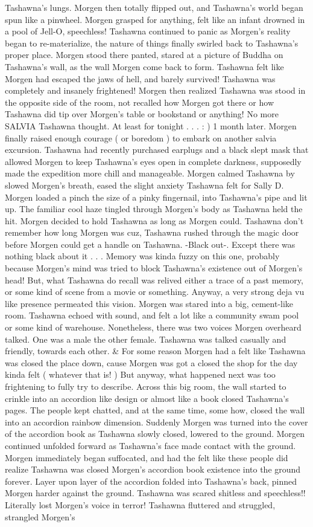 \documentclass[12pt]{book}
\begin{document}
Tashawna's lungs. Morgen then totally flipped out, and Tashawna's world began spun like a pinwheel. Morgen grasped for anything, felt like an infant drowned in a pool of Jell-O, speechless! Tashawna continued to panic as Morgen's reality began to re-materialize, the nature of things finally swirled back to Tashawna's proper place. Morgen stood there panted, stared at a picture of Buddha on Tashawna's wall, as the wall Morgen come back to form. Tashawna felt like Morgen had escaped the jaws of hell, and barely survived! Tashawna was completely and insanely frightened! Morgen then realized Tashawna was stood in the opposite side of the room, not recalled how Morgen got there or how Tashawna did tip over Morgen's table or bookstand or anything! No more SALVIA Tashawna thought. At least for tonight . . .  :  ) 1 month later. Morgen finally raised enough courage ( or boredom ) to embark on another salvia excursion. Tashawna had recently purchased earplugs and a black slept mask that allowed Morgen to keep Tashawna's eyes open in complete darkness, supposedly made the expedition more chill and manageable. Morgen calmed Tashawna by slowed Morgen's breath, eased the slight anxiety Tashawna felt for Sally D. Morgen loaded a pinch the size of a pinky fingernail, into Tashawna's pipe and lit up. The familiar cool haze tingled through Morgen's body as Tashawna held the hit. Morgen decided to hold Tashawna as long as Morgen could. Tashawna don't remember how long Morgen was cuz, Tashawna rushed through the magic door before Morgen could get a handle on Tashawna. -Black out-. Except there was nothing black about it . . .  Memory was kinda fuzzy on this one, probably because Morgen's mind was tried to block Tashawna's existence out of Morgen's head! But, what Tashawna do recall was relived either a trace of a past memory, or some kind of scene from a movie or something. Anyway, a very strong deja vu like presence permeated this vision. Morgen was stared into a big, cement-like room. Tashawna echoed with sound, and felt a lot like a community swam pool or some kind of warehouse. Nonetheless, there was two voices Morgen overheard talked. One was a male the other female. Tashawna was talked casually and friendly, towards each other. \& For some reason Morgen had a felt like Tashawna was closed the place down, cause Morgen was got a closed the shop for the day kinda felt ( whatever that is! ) But anyway, what happened next was too frightening to fully try to describe. Across this big room, the wall started to crinkle into an accordion like design or almost like a book closed Tashawna's pages. The people kept chatted, and at the same time, some how, closed the wall into an accordion rainbow dimension. Suddenly Morgen was turned into the cover of the accordion book as Tashawna slowly closed, lowered to the ground. Morgen continued unfolded forward as Tashawna's face made contact with the ground. Morgen immediately began suffocated, and had the felt like these people did realize Tashawna was closed Morgen's accordion book existence into the ground forever. Layer upon layer of the accordion folded into Tashawna's back, pinned Morgen harder against the ground. Tashawna was scared shitless and speechless!! Literally lost Morgen's voice in terror! Tashawna fluttered and struggled, strangled Morgen's 
\end{document}
